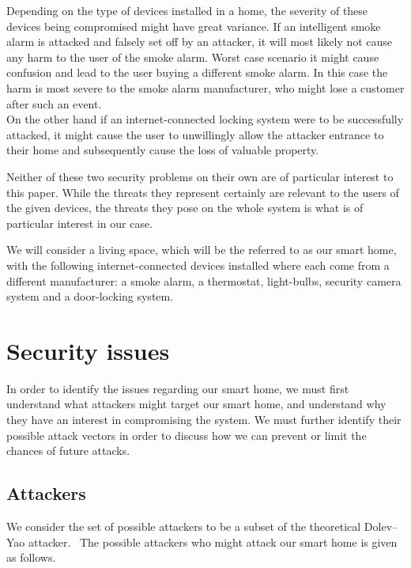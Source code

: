 \documentclass[12pt]{article}
\begin{document}
Depending on the type of devices installed in a home, the severity of these devices being compromised might have great variance. If an intelligent smoke alarm is attacked and falsely set off by an attacker, it will most likely not cause any harm to the user of the smoke alarm. Worst case scenario it might cause confusion and lead to the user buying a different smoke alarm. In this case the harm is most severe to the smoke alarm manufacturer, who might lose a customer after such an event. \\
On the other hand if an internet-connected locking system were to be successfully attacked, it might cause the user to unwillingly allow the attacker entrance to their home and subsequently cause the loss of valuable property.

Neither of these two security problems on their own are of particular interest to this paper. While the threats they represent certainly are relevant to the users of the given devices, the threats they pose on the whole system is what is of particular interest in our case. 

We will consider a living space, which will be the referred to as our smart home, with the following internet-connected devices installed where each come from a different manufacturer: a smoke alarm, a thermostat, light-bulbs, security camera system and a door-locking system.

\newpage

\section{Security issues}
\label{sec:Security issues}

In order to identify the issues regarding our smart home, we must first understand what attackers might target our smart home, and understand why they have an interest in compromising the system. We must further identify their possible attack vectors in order to discuss how we can prevent or limit the chances of future attacks.

\subsection{Attackers}
\label{sub:Attackers}

We consider the set of possible attackers to be a subset of the theoretical Dolev–Yao attacker.~\cite{dolev-yao}
The possible attackers who might attack our smart home is given as follows.
\end{document}
